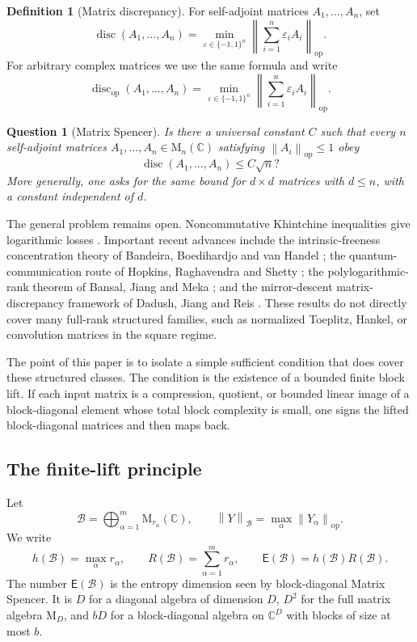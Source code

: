 \documentclass[11pt]{amsart}
\numberwithin{equation}{section}
\newtheorem{question}[theorem]{Question}
\theoremstyle{definition}
\newtheorem{definition}[theorem]{Definition}
\theoremstyle{remark}
\newcommand{\C}{\mathbb C}
\newcommand{\M}{\mathrm M}
\newcommand{\op}{\mathrm{op}}
\newcommand{\disc}{\operatorname{disc}}
\newcommand{\discop}{\operatorname{disc}_{\op}}
\newcommand{\Ent}{\mathsf E}
\newcommand{\norm}[1]{\left\lVert #1\right\rVert}
\newcommand{\eps}{\varepsilon}
\newcommand{\mcB}{\mathcal B}
\begin{document}
\begin{definition}[Matrix discrepancy]
For self-adjoint matrices $A_1,\ldots,A_n$, set
\[
\disc(A_1,\ldots,A_n)
= \min_{\eps\in\{-1,1\}^n}
\norm{\sum_{i=1}^n \eps_i A_i}_{\op} .
\]
For arbitrary complex matrices we use the same formula and write
\[
\discop(A_1,\ldots,A_n)
=\min_{\eps\in\{-1,1\}^n}
\norm{\sum_{i=1}^n\eps_i A_i}_{\op}.
\]
\end{definition}

\begin{question}[Matrix Spencer]
Is there a universal constant $C$ such that every $n$ self-adjoint matrices
$A_1,\ldots,A_n\in \M_n(\C)$ satisfying $\norm{A_i}_{\op}\le 1$ obey
\[
\disc(A_1,\ldots,A_n)\le C\sqrt n?
\]
More generally, one asks for the same bound for $d\times d$ matrices with
$d\le n$, with a constant independent of $d$.
\end{question}

The general problem remains open. Noncommutative Khintchine inequalities give
logarithmic losses \cite{LustPisier,Pisier}. Important recent advances include
the intrinsic-freeness concentration theory of Bandeira, Boedihardjo and van
Handel \cite{BBvH}; the quantum-communication route of Hopkins, Raghavendra and
Shetty \cite{HRS}; the polylogarithmic-rank theorem of Bansal, Jiang and Meka
\cite{BJM}; and the mirror-descent matrix-discrepancy framework of Dadush,
Jiang and Reis \cite{DJR}. These results do not directly cover many full-rank
structured families, such as normalized Toeplitz, Hankel, or convolution
matrices in the square regime.

The point of this paper is to isolate a simple sufficient condition that does
cover these structured classes. The condition is the existence of a bounded
finite block lift. If each input matrix is a compression, quotient, or bounded
linear image of a block-diagonal element whose total block complexity is small,
one signs the lifted block-diagonal matrices and then maps back.

\subsection{The finite-lift principle}

Let
\[
\mcB=\bigoplus_{\alpha=1}^m \M_{r_\alpha}(\C),
\qquad
\norm{Y}_{\mcB}=\max_\alpha \norm{Y_\alpha}_{\op}.
\]
We write
\[
h(\mcB)=\max_\alpha r_\alpha,\qquad
R(\mcB)=\sum_{\alpha=1}^m r_\alpha,
\qquad
\Ent(\mcB)=h(\mcB)R(\mcB).
\]
The number $\Ent(\mcB)$ is the entropy dimension seen by block-diagonal Matrix
Spencer. It is $D$ for a diagonal algebra of dimension $D$, $D^2$ for the full
matrix algebra $\M_D$, and $bD$ for a block-diagonal algebra on $\C^D$ with
blocks of size at most $b$.
\end{document}
